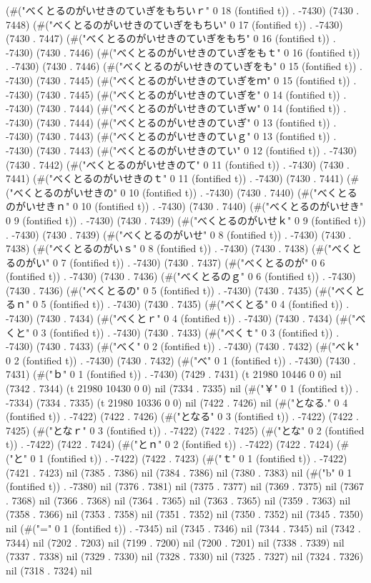 (#("べくとるのがいせきのていぎをもちいｒ" 0 18 (fontified t)) . -7430) (7430 . 7448) (#("べくとるのがいせきのていぎをもちい" 0 17 (fontified t)) . -7430) (7430 . 7447) (#("べくとるのがいせきのていぎをもち" 0 16 (fontified t)) . -7430) (7430 . 7446) (#("べくとるのがいせきのていぎをもｔ" 0 16 (fontified t)) . -7430) (7430 . 7446) (#("べくとるのがいせきのていぎをも" 0 15 (fontified t)) . -7430) (7430 . 7445) (#("べくとるのがいせきのていぎをｍ" 0 15 (fontified t)) . -7430) (7430 . 7445) (#("べくとるのがいせきのていぎを" 0 14 (fontified t)) . -7430) (7430 . 7444) (#("べくとるのがいせきのていぎｗ" 0 14 (fontified t)) . -7430) (7430 . 7444) (#("べくとるのがいせきのていぎ" 0 13 (fontified t)) . -7430) (7430 . 7443) (#("べくとるのがいせきのていｇ" 0 13 (fontified t)) . -7430) (7430 . 7443) (#("べくとるのがいせきのてい" 0 12 (fontified t)) . -7430) (7430 . 7442) (#("べくとるのがいせきのて" 0 11 (fontified t)) . -7430) (7430 . 7441) (#("べくとるのがいせきのｔ" 0 11 (fontified t)) . -7430) (7430 . 7441) (#("べくとるのがいせきの" 0 10 (fontified t)) . -7430) (7430 . 7440) (#("べくとるのがいせきｎ" 0 10 (fontified t)) . -7430) (7430 . 7440) (#("べくとるのがいせき" 0 9 (fontified t)) . -7430) (7430 . 7439) (#("べくとるのがいせｋ" 0 9 (fontified t)) . -7430) (7430 . 7439) (#("べくとるのがいせ" 0 8 (fontified t)) . -7430) (7430 . 7438) (#("べくとるのがいｓ" 0 8 (fontified t)) . -7430) (7430 . 7438) (#("べくとるのがい" 0 7 (fontified t)) . -7430) (7430 . 7437) (#("べくとるのが" 0 6 (fontified t)) . -7430) (7430 . 7436) (#("べくとるのｇ" 0 6 (fontified t)) . -7430) (7430 . 7436) (#("べくとるの" 0 5 (fontified t)) . -7430) (7430 . 7435) (#("べくとるｎ" 0 5 (fontified t)) . -7430) (7430 . 7435) (#("べくとる" 0 4 (fontified t)) . -7430) (7430 . 7434) (#("べくとｒ" 0 4 (fontified t)) . -7430) (7430 . 7434) (#("べくと" 0 3 (fontified t)) . -7430) (7430 . 7433) (#("べくｔ" 0 3 (fontified t)) . -7430) (7430 . 7433) (#("べく" 0 2 (fontified t)) . -7430) (7430 . 7432) (#("べｋ" 0 2 (fontified t)) . -7430) (7430 . 7432) (#("べ" 0 1 (fontified t)) . -7430) (7430 . 7431) (#("ｂ" 0 1 (fontified t)) . -7430) (7429 . 7431) (t 21980 10446 0 0) nil (7342 . 7344) (t 21980 10430 0 0) nil (7334 . 7335) nil (#("￥" 0 1 (fontified t)) . -7334) (7334 . 7335) (t 21980 10336 0 0) nil (7422 . 7426) nil (#("となる." 0 4 (fontified t)) . -7422) (7422 . 7426) (#("となる" 0 3 (fontified t)) . -7422) (7422 . 7425) (#("となｒ" 0 3 (fontified t)) . -7422) (7422 . 7425) (#("とな" 0 2 (fontified t)) . -7422) (7422 . 7424) (#("とｎ" 0 2 (fontified t)) . -7422) (7422 . 7424) (#("と" 0 1 (fontified t)) . -7422) (7422 . 7423) (#("ｔ" 0 1 (fontified t)) . -7422) (7421 . 7423) nil (7385 . 7386) nil (7384 . 7386) nil (7380 . 7383) nil (#("b" 0 1 (fontified t)) . -7380) nil (7376 . 7381) nil (7375 . 7377) nil (7369 . 7375) nil (7367 . 7368) nil (7366 . 7368) nil (7364 . 7365) nil (7363 . 7365) nil (7359 . 7363) nil (7358 . 7366) nil (7353 . 7358) nil (7351 . 7352) nil (7350 . 7352) nil (7345 . 7350) nil (#("=" 0 1 (fontified t)) . -7345) nil (7345 . 7346) nil (7344 . 7345) nil (7342 . 7344) nil (7202 . 7203) nil (7199 . 7200) nil (7200 . 7201) nil (7338 . 7339) nil (7337 . 7338) nil (7329 . 7330) nil (7328 . 7330) nil (7325 . 7327) nil (7324 . 7326) nil (7318 . 7324) nil 